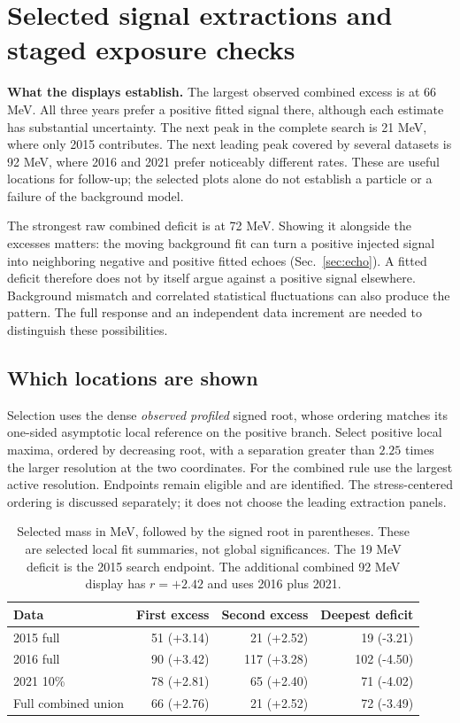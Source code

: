 \section{Selected signal extractions and staged exposure checks}
\label{sec:extractions}
\textbf{What the displays establish.} The largest observed combined excess is at 66 MeV. All three years prefer a positive fitted signal there, although each estimate has substantial uncertainty. The next peak in the complete search is 21 MeV, where only 2015 contributes. The next leading peak covered by several datasets is 92 MeV, where 2016 and 2021 prefer noticeably different rates. These are useful locations for follow-up; the selected plots alone do not establish a particle or a failure of the background model.

The strongest raw combined deficit is at 72 MeV. Showing it alongside the excesses matters: the moving background fit can turn a positive injected signal into neighboring negative and positive fitted echoes (Sec.~\ref{sec:echo}). A fitted deficit therefore does not by itself argue against a positive signal elsewhere. Background mismatch and correlated statistical fluctuations can also produce the pattern. The full response and an independent data increment are needed to distinguish these possibilities.

\subsection*{Which locations are shown}
Selection uses the dense \emph{observed profiled} signed root, whose ordering matches its one-sided asymptotic local reference on the positive branch. Select positive local maxima, ordered by decreasing root, with a separation greater than $2.25$ times the larger resolution at the two coordinates. For the combined rule use the largest active resolution. Endpoints remain eligible and are identified. The stress-centered ordering is discussed separately; it does not choose the leading extraction panels.

\begin{table}[H]\centering\small
\begin{tabular}{lrrr}\toprule
Data & First excess & Second excess & Deepest deficit\\\midrule
2015 full & 51 (+3.14) & 21 (+2.52) & 19 (-3.21)\\
2016 full & 90 (+3.42) & 117 (+3.28) & 102 (-4.50)\\
2021 10\% & 78 (+2.81) & 65 (+2.40) & 71 (-4.02)\\
Full combined union & 66 (+2.76) & 21 (+2.52) & 72 (-3.49)\\
\bottomrule\end{tabular}
\caption{Selected mass in MeV, followed by the signed root in parentheses. These are selected local fit summaries, not global significances. The 19 MeV deficit is the 2015 search endpoint. The additional combined 92 MeV display has $r=+2.42$ and uses 2016 plus 2021.}\end{table}

